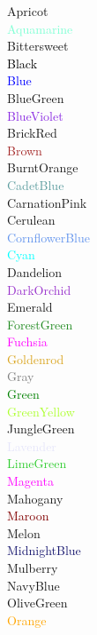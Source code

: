 \documentclass{article}
\begin{document}
\textcolor{Apricot}{Apricot}\\
\textcolor{Aquamarine}{Aquamarine}\\
\textcolor{Bittersweet}{Bittersweet}\\
\textcolor{Black}{Black}\\
\textcolor{Blue}{Blue}\\
\textcolor{BlueGreen}{BlueGreen}\\
\textcolor{BlueViolet}{BlueViolet}\\
\textcolor{BrickRed}{BrickRed}\\
\textcolor{Brown}{Brown}\\
\textcolor{BurntOrange}{BurntOrange}\\
\textcolor{CadetBlue}{CadetBlue}\\
\textcolor{CarnationPink}{CarnationPink}\\
\textcolor{Cerulean}{Cerulean}\\
\textcolor{CornflowerBlue}{CornflowerBlue}\\
\textcolor{Cyan}{Cyan}\\
\textcolor{Dandelion}{Dandelion}\\
\textcolor{DarkOrchid}{DarkOrchid}\\
\textcolor{Emerald}{Emerald}\\
\textcolor{ForestGreen}{ForestGreen}\\
\textcolor{Fuchsia}{Fuchsia}\\
\textcolor{Goldenrod}{Goldenrod}\\
\textcolor{Gray}{Gray}\\
\textcolor{Green}{Green}\\
\textcolor{GreenYellow}{GreenYellow}\\
\textcolor{JungleGreen}{JungleGreen}\\
\textcolor{Lavender}{Lavender}\\
\textcolor{LimeGreen}{LimeGreen}\\
\textcolor{Magenta}{Magenta}\\
\textcolor{Mahogany}{Mahogany}\\
\textcolor{Maroon}{Maroon}\\
\textcolor{Melon}{Melon}\\
\textcolor{MidnightBlue}{MidnightBlue}\\
\textcolor{Mulberry}{Mulberry}\\
\textcolor{NavyBlue}{NavyBlue}\\
\textcolor{OliveGreen}{OliveGreen}\\
\textcolor{Orange}{Orange}\\
\end{document}
